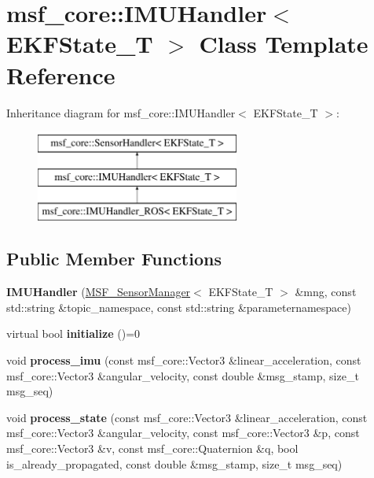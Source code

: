 \hypertarget{classmsf__core_1_1IMUHandler}{\section{msf\-\_\-core\-:\-:I\-M\-U\-Handler$<$ E\-K\-F\-State\-\_\-\-T $>$ Class Template Reference}
\label{classmsf__core_1_1IMUHandler}
}
Inheritance diagram for msf\-\_\-core\-:\-:I\-M\-U\-Handler$<$ E\-K\-F\-State\-\_\-\-T $>$\-:\begin{figure}[H]
\begin{center}
\leavevmode
\includegraphics[height=3.000000cm]{classmsf__core_1_1IMUHandler}
\end{center}
\end{figure}
\subsection*{Public Member Functions}
\begin{DoxyCompactItemize}
\item 
\hypertarget{classmsf__core_1_1IMUHandler_a41084ec0130edd4c1b2934defbd19fb4}{{\bfseries I\-M\-U\-Handler} (\hyperlink{classmsf__core_1_1MSF__SensorManager}{M\-S\-F\-\_\-\-Sensor\-Manager}$<$ E\-K\-F\-State\-\_\-\-T $>$ \&mng, const std\-::string \&topic\-\_\-namespace, const std\-::string \&parameternamespace)}\label{classmsf__core_1_1IMUHandler_a41084ec0130edd4c1b2934defbd19fb4}

\item 
\hypertarget{classmsf__core_1_1IMUHandler_aa343ee8a9375a7c3ecf9a980cf0bc82d}{virtual bool {\bfseries initialize} ()=0}\label{classmsf__core_1_1IMUHandler_aa343ee8a9375a7c3ecf9a980cf0bc82d}

\item 
\hypertarget{classmsf__core_1_1IMUHandler_a6b977a9a49ea5d91c5c61cb063169535}{void {\bfseries process\-\_\-imu} (const msf\-\_\-core\-::\-Vector3 \&linear\-\_\-acceleration, const msf\-\_\-core\-::\-Vector3 \&angular\-\_\-velocity, const double \&msg\-\_\-stamp, size\-\_\-t msg\-\_\-seq)}\label{classmsf__core_1_1IMUHandler_a6b977a9a49ea5d91c5c61cb063169535}

\item 
\hypertarget{classmsf__core_1_1IMUHandler_a46cd980264fb5369147c575a31f1dcb2}{void {\bfseries process\-\_\-state} (const msf\-\_\-core\-::\-Vector3 \&linear\-\_\-acceleration, const msf\-\_\-core\-::\-Vector3 \&angular\-\_\-velocity, const msf\-\_\-core\-::\-Vector3 \&p, const msf\-\_\-core\-::\-Vector3 \&v, const msf\-\_\-core\-::\-Quaternion \&q, bool is\-\_\-already\-\_\-propagated, const double \&msg\-\_\-stamp, size\-\_\-t msg\-\_\-seq)}\label{classmsf__core_1_1IMUHandler_a46cd980264fb5369147c575a31f1dcb2}

\end{DoxyCompactItemize}
